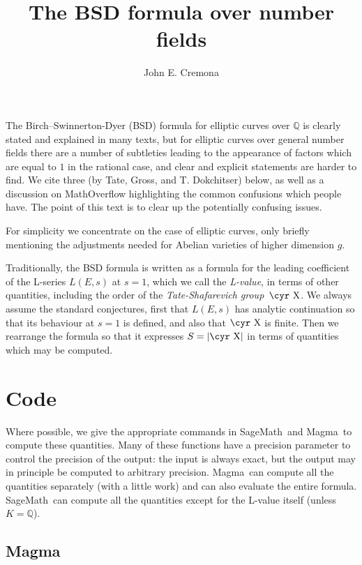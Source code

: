 \documentclass{amsart}
\newcommand{\software}[1]{\textsf{#1}} %
\newcommand{\Sage}{\software{SageMath}{}\ }
\newcommand{\Magma}{\software{Magma}{}\ }
\newcommand{\Sha}{\text{\cyr X}}
\newcommand\Q{\mathbb{Q}}
\begin{document}
\title{The BSD formula over number fields}
\author{John E. Cremona}
\maketitle

The Birch--Swinnerton-Dyer (BSD) formula for elliptic curves over \(\Q\)
is clearly stated and explained in many texts, but for elliptic curves
over general number fields there are a number of subtleties leading to
the appearance of factors which are equal to \(1\) in the rational case,
and clear and explicit statements are harder to find. We cite three (by
Tate, Gross, and T. Dokchitser) below, as well as a discussion on
MathOverflow highlighting the common confusions which people have. The
point of this text is to clear up the potentially confusing issues.

For simplicity we concentrate on the case of elliptic curves, only
briefly mentioning the adjustments needed for Abelian varieties of
higher dimension \(g\).

Traditionally, the BSD formula is written as a formula for the leading
coefficient of the L-series \(L(E,s)\) at \(s=1\), which we call the
\emph{L-value}, in terms of other quantities, including the order of
the \emph{Tate-Shafarevich group}~$\Sha$. We always assume the standard
conjectures, first that \(L(E,s)\) has analytic continuation so that
its behaviour at \(s=1\) is defined, and also that $\Sha$ is finite. Then
we rearrange the formula so that it expresses \(S=|\Sha|\) in terms of
quantities which may be computed.

\section{Code}\label{code}

Where possible, we give the appropriate commands in \Sage and \Magma to
compute these quantities. Many of these functions have a precision
parameter to control the precision of the output: the input is always
exact, but the output may in principle be computed to arbitrary
precision. \Magma can compute all the quantities separately (with a
little work) and can also evaluate the entire formula. \Sage can compute
all the quantities except for the L-value itself (unless \(K=\Q\)).

\subsection{\Magma}\label{magma}
\end{document}
